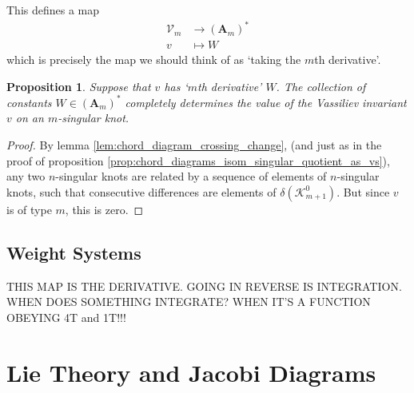 \documentclass[12pt]{report}
\theoremstyle{regular}
\numberwithin{clause}{chapter}
\newtheorem{proposition}[clause]{Proposition}
\newcommand{\scaffold}[1]{
\begin{mdframed}[style=scaffold]
        {\color{teal}#1}
\end{mdframed}
}
\begin{document}
        This defines a map
        \begin{align*}
                \mathcal{V}_{m} &\longrightarrow (\mathbf{A}_{m})^{\ast} \\
                v               & \longmapsto W
        \end{align*}
        which is precisely the map we should think of as `taking the \(m\)th derivative'.

        \begin{proposition}
                Suppose that \(v\) has `\(m\)th derivative' \(W\). The collection of constants \(W \in (\mathbf{A}_{m})^{\ast}\) completely determines the value of the Vassiliev invariant \(v\) on an \(m\)-singular knot.
        \end{proposition}

        \begin{proof}
                By lemma \ref{lem:chord_diagram_crossing_change}, (and just as in the proof of proposition \ref{prop:chord_diagrams_isom_singular_quotient_as_vs}), any two \(n\)-singular knots are related by a sequence of elements of \(n\)-singular knots, such that consecutive differences are elements of \(\delta(\mathcal{K}^{0}_{m + 1})\). But since \(v\) is of type \(m\), this is zero.
        \end{proof}

        \section{Weight Systems}

        \scaffold{THIS MAP IS THE DERIVATIVE. GOING IN REVERSE IS INTEGRATION. WHEN DOES SOMETHING INTEGRATE? WHEN IT'S A FUNCTION OBEYING 4T and 1T!!!}



        \chapter{Lie Theory and Jacobi Diagrams}
        \label{ch:lie-theory-and-jacobi-diagrams}
\end{document}
